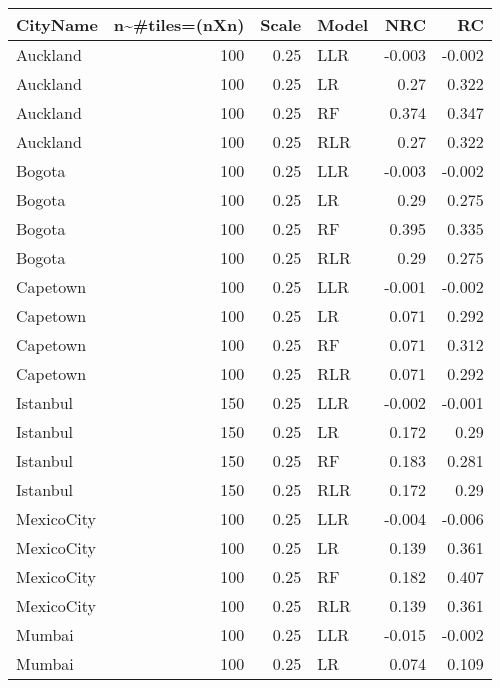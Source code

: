 \begin{tabular}{lrrlrr}
\toprule
 CityName    &   n\textasciitilde{}\#tiles=(nXn) &   Scale & Model   &    NRC &     RC \\
\midrule
 Auckland    &              100 &    0.25 & LLR     & -0.003 & -0.002 \\
 Auckland    &              100 &    0.25 & LR      &  0.27  &  0.322 \\
 Auckland    &              100 &    0.25 & RF      &  0.374 &  0.347 \\
 Auckland    &              100 &    0.25 & RLR     &  0.27  &  0.322 \\
 Bogota      &              100 &    0.25 & LLR     & -0.003 & -0.002 \\
 Bogota      &              100 &    0.25 & LR      &  0.29  &  0.275 \\
 Bogota      &              100 &    0.25 & RF      &  0.395 &  0.335 \\
 Bogota      &              100 &    0.25 & RLR     &  0.29  &  0.275 \\
 Capetown    &              100 &    0.25 & LLR     & -0.001 & -0.002 \\
 Capetown    &              100 &    0.25 & LR      &  0.071 &  0.292 \\
 Capetown    &              100 &    0.25 & RF      &  0.071 &  0.312 \\
 Capetown    &              100 &    0.25 & RLR     &  0.071 &  0.292 \\
 Istanbul    &              150 &    0.25 & LLR     & -0.002 & -0.001 \\
 Istanbul    &              150 &    0.25 & LR      &  0.172 &  0.29  \\
 Istanbul    &              150 &    0.25 & RF      &  0.183 &  0.281 \\
 Istanbul    &              150 &    0.25 & RLR     &  0.172 &  0.29  \\
 MexicoCity  &              100 &    0.25 & LLR     & -0.004 & -0.006 \\
 MexicoCity  &              100 &    0.25 & LR      &  0.139 &  0.361 \\
 MexicoCity  &              100 &    0.25 & RF      &  0.182 &  0.407 \\
 MexicoCity  &              100 &    0.25 & RLR     &  0.139 &  0.361 \\
 Mumbai      &              100 &    0.25 & LLR     & -0.015 & -0.002 \\
 Mumbai      &              100 &    0.25 & LR      &  0.074 &  0.109 \\

\end{tabular}
